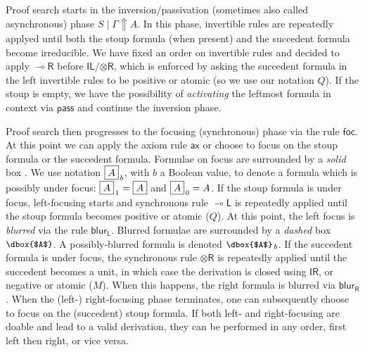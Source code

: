 \documentclass[runningheads]{llncs}
\newcommand{\tr}{\otimes \mathsf{R}}
\newcommand{\lright}{{\multimap}\mathsf{R}}
\newcommand{\lleft}{{\multimap}\mathsf{L}}
\newcommand{\pass}{\mathsf{pass}}
\newcommand{\unitl}{\mathsf{IL}}
\newcommand{\unitr}{\mathsf{IR}}
\newcommand{\otR}{\tr}
\newcommand{\lolliR}{\lright}
\newcommand{\lolliL}{\lleft}
\newcommand{\IL}{\unitl}
\newcommand{\IR}{\unitr}
\newcommand{\ax}{\mathsf{ax}}
\newcommand{\up}{\Uparrow}
\newcommand{\foc}{\mathsf{foc}}
\newcommand{\blurL}{\mathsf{blur_L}}
\newcommand{\blurR}{\mathsf{blur_R}}
\begin{document}
Proof search starts in the inversion/passivation (sometimes also called asynchronous) phase $S \mid \Gamma \up A$. In this phase, invertible rules are repeatedly applyed until both the stoup formula (when present) and the succedent formula become irreducible. We have fixed an order on invertible rules and decided to apply $\lolliR$ before $\IL$/$\otR$, which is enforced by asking the succedent formula in the left invertible rules to be positive or atomic (so we use our notation $Q$). 
If the stoup is empty, we have the possibility of \emph{activating} the leftmost formula in context via $\pass$ and continue the inversion phase.

Proof search then progresses to the focusing (synchronous) phase via the rule $\foc$. At this point we can apply the axiom rule $\ax$ or choose to focus on the stoup formula or the succedent formula. Formulae on focus are surrounded by a \emph{solid} box {\small{}}. We use notation {\small{$\fbox{$A$}_{\,b}$}}, with $b$ a Boolean value, to denote a formula which is possibly under focus: {\small{$\fbox{$A$}_{\,1} = \fbox{$A$}$}} and {\small{$\fbox{$A$}_{\,0} = A$}}. If the stoup formula is under focus, left-focusing starts and synchronous rule $\lolliL$ is repeatedly applied until the stoup formula becomes positive or atomic ($Q$). At this point, the left focus is \emph{blurred} via the rule $\blurL$. Blurred formulae are surrounded by a \emph{dashed} box ${\small{\dbox{$A$}}}$. A possibly-blurred formula is denoted ${\small{\dbox{$A$}_{\,b}}}$. If the succedent formula is under focus, the synchronous rule $\otR$ is repeatedly applied until the succedent becomes a unit, in which case the derivation is closed using $\IR$, or negative or atomic ($M$). When this happens, the right formula is blurred via $\blurR$. When the (left-) right-focusing phase terminates, one can subsequently choose to focus on the (succedent) stoup formula. If both left- and right-focusing are doable and lead to a valid derivation, they can be performed in any order, first left then right, or vice versa.
\end{document}
